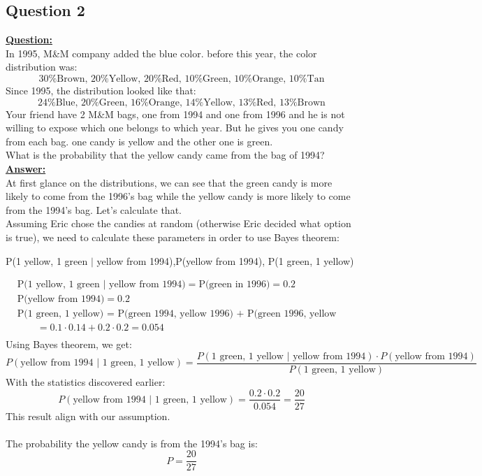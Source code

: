 \documentclass[a4, 12pt,titlepage]{scrartcl}
\begin{document}
\subsection{Question 2}
\textbf{\underline{Question:}}\\
In 1995, M\&M company added the blue color. before this year, the color distribution was:\[
\textrm{30\% Brown, 20\% Yellow, 20\% Red, 10\% Green, 10\% Orange, 10\% Tan}
\]
Since 1995, the distribution looked like that:\[
\textrm{24\% Blue, 20\% Green, 16\% Orange, 14\% Yellow, 13\% Red, 13\% Brown}
\]
Your friend have 2 M\&M bags, one from 1994 and one from 1996 and he is not willing to expose which one belongs to which year. But he gives you one candy from each bag. one candy is yellow and the other one is green.\\
What is the probability that the yellow candy came from the bag of 1994?\\

\textbf{\underline{Answer:}}\\
At first glance on the distributions, we can see that the green candy is more likely to come from the 1996's bag while the yellow candy is more likely to come from the 1994's bag. Let's calculate that.\\

Assuming Eric chose the candies at random (otherwise Eric decided what option is true), we need to calculate these parameters in order to use Bayes theorem:
\begin{center}
\quad P(1 yellow, 1 green $|$ yellow from 1994),\quad P(yellow from 1994), \quad P(1 green, 1 yellow)
\end{center}\smallskip
\begin{align*}
&\textrm{P(1 yellow, 1 green $|$ yellow from 1994)}=\textrm{P(green in 1996)}=0.2\\
&\textrm{P(yellow from 1994)}=0.2\\
&\textrm{P(1 green, 1 yellow) = P(green 1994, yellow 1996) + P(green 1996, yellow 1994)}\\
&\qquad=0.1\cdot 0.14+0.2\cdot 0.2=0.054\\
\end{align*}Using Bayes theorem, we get:\[
P(\textrm{yellow from 1994 $|$ 1 green, 1 yellow})=\frac{P(\textrm{1 green, 1 yellow $|$ yellow from 1994})\cdot P(\textrm{yellow from 1994})}{P(\textrm{1 green, 1 yellow})}
\]
With the statistics discovered earlier:\[
P(\textrm{yellow from 1994 $|$ 1 green, 1 yellow})=\frac{0.2\cdot 0.2}{0.054}=\frac{20}{27}
\]
This result align with our assumption.\\\smallskip\\
The probability the yellow candy is from the 1994's bag is:
\[
\boxed{P=\frac{20}{27}}
\]
\newpage
\end{document}
